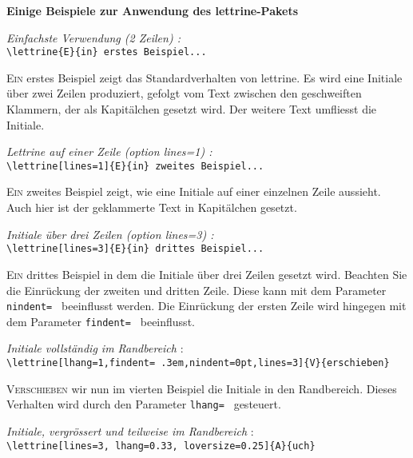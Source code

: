 \documentclass[a4paper,12pt,german]{article}
\begin{document}
\thispagestyle{empty}

\begin{center}
\large\bfseries Einige Beispiele zur Anwendung des lettrine-Pakets
\end{center}

\vspace{\baselineskip}
\textit{Einfachste Verwendung (2 Zeilen) :}\\
\verb+\lettrine{E}{in} erstes Beispiel...+

\lettrine{E}{in} erstes Beispiel zeigt das Standardverhalten von lettrine.
Es wird eine Initiale über zwei Zeilen produziert, gefolgt vom Text zwischen
den geschweiften Klammern, der als Kapitälchen gesetzt wird. Der weitere
Text umfliesst die Initiale.

\vspace{\baselineskip}
\textit{Lettrine auf einer Zeile (option {\ttfamily\upshape lines=1}) :}\\
\verb+\lettrine[lines=1]{E}{in} zweites Beispiel...+

\lettrine[lines=1]{E}{in} zweites Beispiel zeigt, wie eine Initiale auf
einer einzelnen Zeile aussieht. Auch hier ist der geklammerte Text in
Kapitälchen gesetzt.

\vspace{\baselineskip}
\textit{Initiale über drei Zeilen (option {\ttfamily\upshape lines=3}) :}\\
\verb+\lettrine[lines=3]{E}{in} drittes Beispiel...+

\lettrine[lines=3]{E}{in} drittes Beispiel in dem die Initiale über drei
Zeilen gesetzt wird. Beachten Sie die Einrückung der zweiten und dritten
Zeile. Diese kann mit dem Parameter \verb+nindent= + beeinflusst werden. Die
Einrückung der ersten Zeile wird hingegen mit dem Parameter \verb+findent= +
beeinflusst.

\vspace{\baselineskip}
\textit{Initiale vollständig im Randbereich} :\\
\verb+\lettrine[lhang=1,findent= .3em,nindent=0pt,lines=3]{V}{erschieben}+

\lettrine[lhang=1,findent= .3em,nindent=0pt,lines=3]{V}{erschieben}
wir nun im vierten Beispiel die Initiale in den Randbereich.
Dieses Verhalten wird durch den Parameter \verb+lhang= + gesteuert.

\vspace{\baselineskip}
\textit{Initiale, vergrössert und teilweise im Randbereich} :\\
\verb+\lettrine[lines=3, lhang=0.33, loversize=0.25]{A}{uch}+
\end{document}
